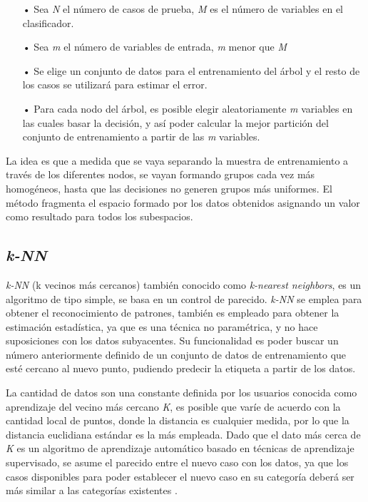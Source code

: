 \begin{itemize}
\item[•] Sea \textit{N} el número de casos de prueba, \textit{M} es el número de variables en el clasificador.
\item[•] Sea \textit{m} el número de variables de entrada, \textit{m} menor que \textit{M}
\item[•] Se elige un conjunto de datos para el entrenamiento del árbol y el resto de los casos se utilizará para estimar el error.
\item[•] Para cada nodo del árbol, es posible elegir aleatoriamente \textit{m} variables en las cuales basar la decisión, y así poder calcular la mejor partición del conjunto de entrenamiento a partir de las \textit{m} variables.
\end{itemize}

La idea es que a medida que se vaya separando la muestra de entrenamiento a través de los diferentes nodos, se vayan formando grupos cada vez más homogéneos, hasta que las decisiones no generen grupos más uniformes. El método fragmenta el espacio formado por los datos obtenidos asignando un valor como resultado para todos los subespacios.


\subsection{\textit{k-NN}}

\textit{k-NN} (k vecinos más cercanos) también conocido como \textit{k-nearest neighbors}, es un algoritmo de tipo simple, se basa en un control de parecido. \textit{k-NN} se emplea para obtener el reconocimiento de patrones, también es empleado para obtener la estimación estadística, ya que es una técnica no paramétrica, y no hace suposiciones con los datos subyacentes. Su funcionalidad es poder buscar un número anteriormente definido de un conjunto de datos de entrenamiento que esté cercano al nuevo punto, pudiendo predecir la etiqueta a partir de los datos.


La cantidad de datos son una constante definida por los usuarios conocida como aprendizaje del vecino más cercano \textit{K}, es posible que varíe de acuerdo con la cantidad local de puntos, donde la distancia es cualquier medida, por lo que la distancia euclidiana estándar es la más empleada. Dado que el dato más cerca de \textit{K} es un algoritmo de aprendizaje automático basado en técnicas de aprendizaje supervisado, se asume el parecido entre el nuevo caso con los datos, ya que los casos disponibles para poder establecer el nuevo caso en su categoría deberá ser más similar a las categorías existentes \cite{JimenezLeon2021}.

